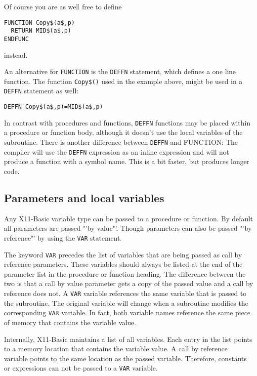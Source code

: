 Of course you are as well free to define 
\begin{mdframed}[hidealllines=true,backgroundcolor=blue!20]
\begin{verbatim}
FUNCTION Copy$(a$,p)
  RETURN MID$(a$,p)
ENDFUNC
\end{verbatim}
\end{mdframed}
instead.

An alternative for \verb|FUNCTION| is the \verb|DEFFN| statement, which 
defines a one line function.
The function \verb|Copy$()| used in the example above, might be used in a
\verb|DEFFN| statement as well:
\begin{mdframed}[hidealllines=true,backgroundcolor=blue!20]
\begin{verbatim}
DEFFN Copy$(a$,p)=MID$(a$,p)
\end{verbatim}
\end{mdframed}

In contrast with procedures and functions, \verb|DEFFN| functions may be placed
within a procedure or function body, although it doesn't use the local variables
of the subroutine. There is another difference between \verb|DEFFN| and
FUNCTION: The compiler will use the \verb|DEFFN| expression as an inline
expression and will not produce a function with a symbol name. This is a bit
faster, but produces longer code.

\subsection{Parameters and local variables}

Any X11-Basic variable type can be passed to a procedure or function. 
By default all parameters are passed "'by value"'. Though parameters can also be
passed "'by reference"' by using the \verb|VAR| statement.

The keyword \verb|VAR| precedes the list of variables that are being passed as
call by reference parameters. These variables should always be listed at
the end of the parameter list in the procedure or function heading. The
difference between the two is that a call by value parameter gets a copy of
the passed value and a call by reference does not. A \verb|VAR| variable
references the same variable that is passed to the subroutine. The original
variable will change when a subroutine modifies the corresponding \verb|VAR|
variable. In fact, both variable names reference the same piece of memory
that contains the variable value. 

Internally, X11-Basic maintains a list of all variables. Each entry in the
list points to a memory location that contains the variable value. A call
by reference variable points to the same location as the passed variable.
Therefore, constants or expressions can not be passed to a \verb|VAR| variable.

